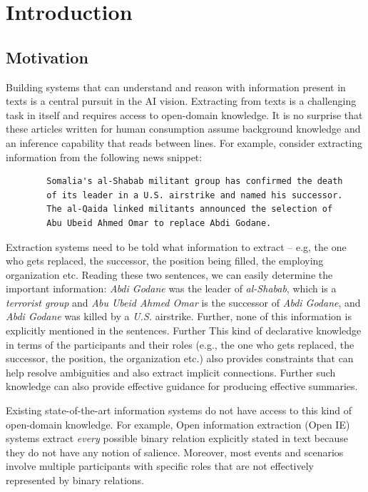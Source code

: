 \section{Introduction}
\subsection{Motivation}

Building systems that can understand and reason with information present in texts is a central pursuit in the AI vision. Extracting from texts is a challenging task in itself and requires access to open-domain knowledge. It is no surprise that these articles written for human consumption assume background knowledge and an inference capability that reads between lines. For example, consider extracting information from the following news snippet:

\begin{verbatim}
        Somalia's al-Shabab militant group has confirmed the death 
        of its leader in a U.S. airstrike and named his successor. 
        The al-Qaida linked militants announced the selection of 
        Abu Ubeid Ahmed Omar to replace Abdi Godane. 
\end{verbatim}

Extraction systems need to be told what information to extract -- e.g, the one who gets replaced, the successor, the position being filled, the employing organization etc. Reading these two sentences, we can easily determine the important information: {\em Abdi Godane} was the leader of {\em al-Shabab}, which is a {\em terrorist group} and {\em Abu Ubeid Ahmed Omar} is the successor of {\em Abdi Godane}, and {\em Abdi Godane} was killed by a {\em U.S.} airstrike.  Further, none of this information is explicitly mentioned in the sentences. Further This kind of declarative knowledge in terms of the participants and their roles (e.g., the one who gets replaced, the successor, the position, the organization etc.) also provides constraints that can help resolve ambiguities and also extract implicit connections. Further such knowledge can also provide effective guidance for producing effective summaries. 

Existing state-of-the-art information systems do not have access to this kind of open-domain knowledge.
For example, Open information extraction (Open IE) systems extract {\em every} possible binary relation explicitly stated in text because they do not have any notion of salience. Moreover, most events and scenarios involve multiple participants with specific roles that are not effectively represented by binary relations. 

